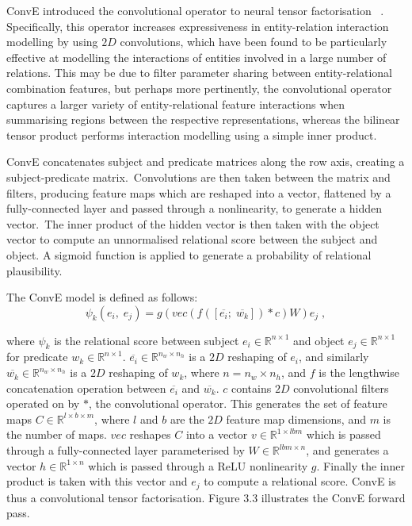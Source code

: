 ConvE introduced the convolutional operator to neural tensor factorisation \unskip ~\citep{dettmers2018convolutional}. Specifically, this operator increases expressiveness in entity-relation interaction modelling by using $ 2D $ convolutions, which have been found to be particularly effective at modelling the interactions of entities involved in a large number of relations. This may be due to filter parameter sharing between entity-relational combination features, but perhaps more pertinently, the convolutional operator captures a larger variety of entity-relational feature interactions when summarising regions between the respective representations, whereas the bilinear tensor product performs interaction modelling using a simple inner product. \par

\noindent ConvE concatenates subject and predicate matrices along the row axis, creating a subject-predicate matrix.\ Convolutions are then taken between the matrix and filters, producing feature maps which are reshaped into a vector, flattened by a fully-connected layer and passed through a nonlinearity, to generate a hidden vector.\ The inner product of the hidden vector is then taken with the object vector to compute an unnormalised relational score between the subject and object. A sigmoid function is applied to generate a probability of relational plausibility. \par

\noindent The ConvE model is defined as follows:
\begin{equation}
	\psi_k(e_i, \; e_j) = g(vec(f(\left [ \overline{e_i}; \; \overline{w_k} \right ]) * c)W )e_j \; ,
\end{equation}

\noindent where $ \psi_k $ is the relational score between subject $ e_i \in \mathbb{R}^{n \times 1} $ and object $ e_j \in \mathbb{R}^{n \times 1} $ for predicate $ w_k \in \mathbb{R}^{n \times 1} $. $ \overline{e_i} \in \mathbb{R}^{n_w \times n_h} $ is a $ 2D $ reshaping of $ e_i $, and similarly $ \overline{w_k} \in \mathbb{R}^{n_w \times n_h} $ is a $ 2D $ reshaping of $ w_k $, where $ n = n_w \times n_h $, and $ f $ is the lengthwise concatenation operation between $ \overline{e_i} $ and $ \overline{w_k} $. $ c $ contains $ 2D $ convolutional filters operated on by $ * $, the convolutional operator. This generates the set of feature maps $ C \in \mathbb{R}^{l \times b \times m} $, where $ l $ and $ b $ are the $ 2D $ feature map dimensions, and $ m $ is the number of maps. $ vec $ reshapes $ C $ into a vector $ v \in \mathbb{R}^{1 \times lbm} $ which is passed through a fully-connected layer parameterised by $ W \in \mathbb{R}^{lbm \times n} $, and generates a vector $ h \in \mathbb{R}^{1 \times n} $ which is passed through a ReLU nonlinearity $ g $. Finally the inner product is taken with this vector and $ e_j $ to compute a relational score. ConvE is thus a convolutional tensor factorisation. Figure 3.3 illustrates the ConvE forward pass.

